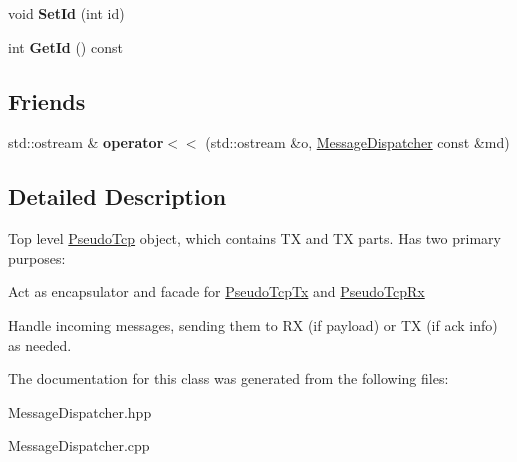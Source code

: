 \begin{DoxyCompactItemize}
\item 
\hypertarget{classPseudoTcp_1_1MessageDispatcher_a4b2636001000dc4400b3767c69f17e38}{
void {\bfseries SetId} (int id)}
\label{classPseudoTcp_1_1MessageDispatcher_a4b2636001000dc4400b3767c69f17e38}

\item 
\hypertarget{classPseudoTcp_1_1MessageDispatcher_a9f10aed4d1487c935012a8c0cb954add}{
int {\bfseries GetId} () const }
\label{classPseudoTcp_1_1MessageDispatcher_a9f10aed4d1487c935012a8c0cb954add}

\end{DoxyCompactItemize}
\subsection*{Friends}
\begin{DoxyCompactItemize}
\item 
\hypertarget{classPseudoTcp_1_1MessageDispatcher_adbc53f711c49498562b7a674451cd0ab}{
std::ostream \& {\bfseries operator$<$$<$} (std::ostream \&o, \hyperlink{classPseudoTcp_1_1MessageDispatcher}{MessageDispatcher} const \&md)}
\label{classPseudoTcp_1_1MessageDispatcher_adbc53f711c49498562b7a674451cd0ab}

\end{DoxyCompactItemize}


\subsection{Detailed Description}
Top level \hyperlink{namespacePseudoTcp}{PseudoTcp} object, which contains TX and TX parts. Has two primary purposes:
\begin{DoxyEnumerate}
\item Act as encapsulator and facade for \hyperlink{classPseudoTcp_1_1PseudoTcpTx}{PseudoTcpTx} and \hyperlink{classPseudoTcp_1_1PseudoTcpRx}{PseudoTcpRx}
\item Handle incoming messages, sending them to RX (if payload) or TX (if ack info) as needed. 
\end{DoxyEnumerate}

The documentation for this class was generated from the following files:\begin{DoxyCompactItemize}
\item 
MessageDispatcher.hpp\item 
MessageDispatcher.cpp\end{DoxyCompactItemize}
